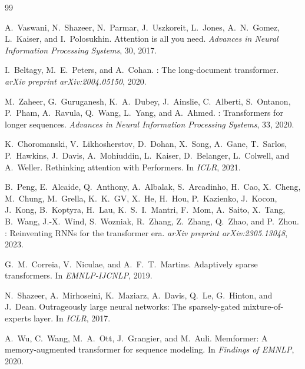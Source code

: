 \begingroup
\small
\begin{thebibliography}{99}

A.~Vaswani, N.~Shazeer, N.~Parmar, J.~Uszkoreit, L.~Jones, A.~N.~Gomez,
L.~Kaiser, and I.~Polosukhin.
\newblock Attention is all you need.
\newblock \textit{Advances in Neural Information Processing Systems}, 30, 2017.

I.~Beltagy, M.~E.~Peters, and A.~Cohan.
: The long-document transformer.
\newblock \textit{arXiv preprint arXiv:2004.05150}, 2020.

M.~Zaheer, G.~Guruganesh, K.~A.~Dubey, J.~Ainslie, C.~Alberti, S.~Ontanon,
P.~Pham, A.~Ravula, Q.~Wang, L.~Yang, and A.~Ahmed.
: Transformers for longer sequences.
\newblock \textit{Advances in Neural Information Processing Systems}, 33, 2020.

K.~Choromanski, V.~Likhosherstov, D.~Dohan, X.~Song, A.~Gane, T.~Sarlos,
P.~Hawkins, J.~Davis, A.~Mohiuddin, L.~Kaiser, D.~Belanger, L.~Colwell,
and A.~Weller.
\newblock Rethinking attention with {Performers}.
\newblock In \textit{ICLR}, 2021.

B.~Peng, E.~Alcaide, Q.~Anthony, A.~Albalak, S.~Arcadinho, H.~Cao,
X.~Cheng, M.~Chung, M.~Grella, K.~K.~GV, X.~He, H.~Hou, P.~Kazienko,
J.~Kocon, J.~Kong, B.~Koptyra, H.~Lau, K.~S.~I.~Mantri, F.~Mom,
A.~Saito, X.~Tang, B.~Wang, J.-X.~Wind, S.~Wozniak, R.~Zhang, Z.~Zhang,
Q.~Zhao, and P.~Zhou.
: Reinventing {RNNs} for the transformer era.
\newblock \textit{arXiv preprint arXiv:2305.13048}, 2023.

G.~M.~Correia, V.~Niculae, and A.~F.~T.~Martins.
\newblock Adaptively sparse transformers.
\newblock In \textit{EMNLP-IJCNLP}, 2019.

N.~Shazeer, A.~Mirhoseini, K.~Maziarz, A.~Davis, Q.~Le, G.~Hinton, and
J.~Dean.
\newblock Outrageously large neural networks: The sparsely-gated
mixture-of-experts layer.
\newblock In \textit{ICLR}, 2017.

A.~Wu, C.~Wang, M.~A.~Ott, J.~Grangier, and M.~Auli.
\newblock Memformer: A memory-augmented transformer for sequence modeling.
\newblock In \textit{Findings of EMNLP}, 2020.


\end{thebibliography}
